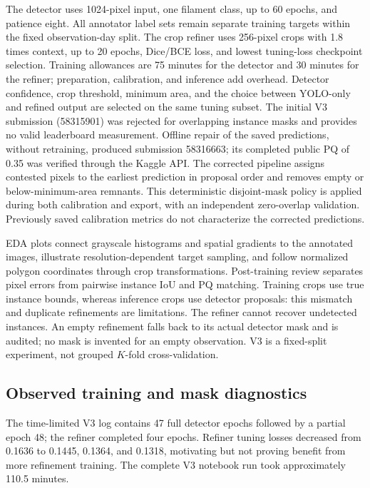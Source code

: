\documentclass[sigconf]{acmart}
\begin{document}
The detector uses 1024-pixel input, one filament class, up to 60 epochs,
and patience eight. All annotator label sets remain separate training
targets within the fixed observation-day split. The crop refiner uses
256-pixel crops with 1.8 times context, up to 20 epochs, Dice/BCE loss,
and lowest tuning-loss checkpoint selection. Training allowances are
75 minutes for the detector and 30 minutes for the refiner; preparation,
calibration, and inference add overhead.
Detector confidence, crop threshold, minimum area, and the choice between
YOLO-only and refined output are selected on the same tuning subset.
The initial V3 submission (58315901) was rejected for overlapping instance
masks and provides no valid leaderboard measurement. Offline repair of
the saved predictions, without retraining, produced submission 58316663;
its completed public PQ of 0.35 was verified through the Kaggle API.
The corrected pipeline assigns contested pixels to the earliest prediction
in proposal order and removes empty or below-minimum-area remnants.
This deterministic disjoint-mask policy is applied during both calibration
and export, with an independent zero-overlap validation. Previously saved
calibration metrics do not characterize the corrected predictions.

EDA plots connect grayscale histograms and spatial gradients to the
annotated images, illustrate resolution-dependent target sampling,
and follow normalized polygon coordinates through crop transformations.
Post-training review separates pixel errors from pairwise instance IoU
and PQ matching. Training crops use true instance bounds, whereas inference
crops use detector proposals: this mismatch and duplicate refinements are
limitations. The refiner cannot recover undetected instances.
An empty refinement falls back to its actual detector mask and is audited;
no mask is invented for an empty observation. V3 is a fixed-split
experiment, not grouped $K$-fold cross-validation.

\subsection{Observed training and mask diagnostics}
The time-limited V3 log contains 47 full detector epochs followed by a
partial epoch 48; the refiner completed four epochs. Refiner tuning losses
decreased from 0.1636 to 0.1445, 0.1364, and 0.1318, motivating but not
proving benefit from more refinement training. The complete V3 notebook
run took approximately 110.5 minutes.
\end{document}
